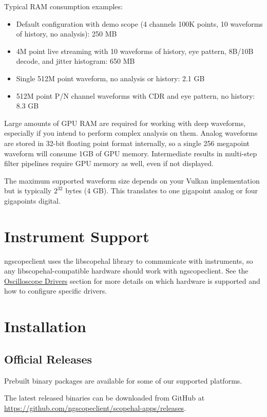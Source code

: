 Typical RAM consumption examples:
\begin{itemize}
\item Default configuration with demo scope (4 channels 100K points, 10 waveforms of history, no analysis): 250 MB
\item 4M point live streaming with 10 waveforms of history, eye pattern, 8B/10B decode, and jitter histogram: 650 MB
\item Single 512M point waveform, no analysis or history: 2.1 GB
\item 512M point P/N channel waveforms with CDR and eye pattern, no history: 8.3 GB
\end{itemize}

Large amounts of GPU RAM are required for working with deep waveforms, especially if you intend to perform
complex analysis on them. Analog waveforms are stored in 32-bit floating point format internally, so a single 256
megapoint waveform will consume 1GB of GPU memory. Intermediate results in multi-step filter pipelines require GPU
memory as well, even if not displayed.

The maximum supported waveform size depends on your Vulkan implementation but is typically $2^32$ bytes (4 GB). This
translates to one gigapoint analog or four gigapoints digital.

\section{Instrument Support}

ngscopeclient uses the libscopehal library to communicate with instruments, so any libscopehal-compatible hardware
should work with ngscopeclient. See the \hyperref[sec:scope-drivers]{Oscilloscope Drivers} section for more details on
which hardware is supported and how to configure specific drivers.

\section{Installation}

\subsection{Official Releases}

Prebuilt binary packages are available for some of our supported platforms.

The latest released binaries can be downloaded from GitHub at \url{https://github.com/ngscopeclient/scopehal-apps/releases}.

